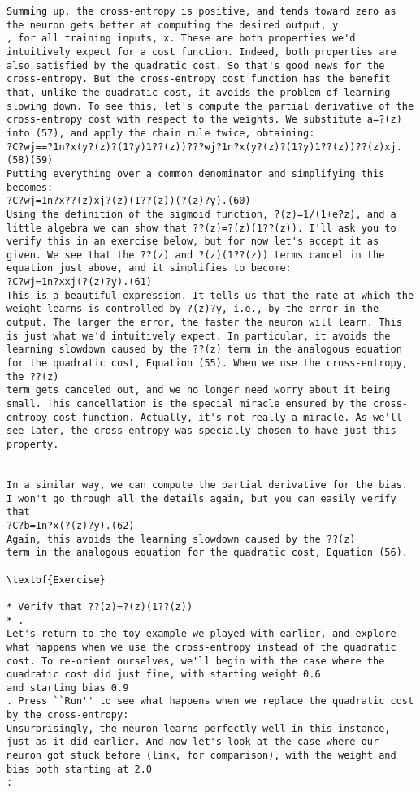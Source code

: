 \begin{lstlisting}
Summing up, the cross-entropy is positive, and tends toward zero as the neuron gets better at computing the desired output, y
, for all training inputs, x. These are both properties we'd intuitively expect for a cost function. Indeed, both properties are also satisfied by the quadratic cost. So that's good news for the cross-entropy. But the cross-entropy cost function has the benefit that, unlike the quadratic cost, it avoids the problem of learning slowing down. To see this, let's compute the partial derivative of the cross-entropy cost with respect to the weights. We substitute a=?(z) into (57), and apply the chain rule twice, obtaining: 
?C?wj==?1n?x(y?(z)?(1?y)1??(z))???wj?1n?x(y?(z)?(1?y)1??(z))??(z)xj.(58)(59)
Putting everything over a common denominator and simplifying this becomes: 
?C?wj=1n?x??(z)xj?(z)(1??(z))(?(z)?y).(60)
Using the definition of the sigmoid function, ?(z)=1/(1+e?z), and a little algebra we can show that ??(z)=?(z)(1??(z)). I'll ask you to verify this in an exercise below, but for now let's accept it as given. We see that the ??(z) and ?(z)(1??(z)) terms cancel in the equation just above, and it simplifies to become: 
?C?wj=1n?xxj(?(z)?y).(61)
This is a beautiful expression. It tells us that the rate at which the weight learns is controlled by ?(z)?y, i.e., by the error in the output. The larger the error, the faster the neuron will learn. This is just what we'd intuitively expect. In particular, it avoids the learning slowdown caused by the ??(z) term in the analogous equation for the quadratic cost, Equation (55). When we use the cross-entropy, the ??(z)
term gets canceled out, and we no longer need worry about it being small. This cancellation is the special miracle ensured by the cross-entropy cost function. Actually, it's not really a miracle. As we'll see later, the cross-entropy was specially chosen to have just this property.


In a similar way, we can compute the partial derivative for the bias. I won't go through all the details again, but you can easily verify that 
?C?b=1n?x(?(z)?y).(62)
Again, this avoids the learning slowdown caused by the ??(z)
term in the analogous equation for the quadratic cost, Equation (56).

\textbf{Exercise}

* Verify that ??(z)=?(z)(1??(z))
* .
Let's return to the toy example we played with earlier, and explore what happens when we use the cross-entropy instead of the quadratic cost. To re-orient ourselves, we'll begin with the case where the quadratic cost did just fine, with starting weight 0.6
and starting bias 0.9
. Press ``Run'' to see what happens when we replace the quadratic cost by the cross-entropy:
Unsurprisingly, the neuron learns perfectly well in this instance, just as it did earlier. And now let's look at the case where our neuron got stuck before (link, for comparison), with the weight and bias both starting at 2.0
:


\end{lstlisting}
